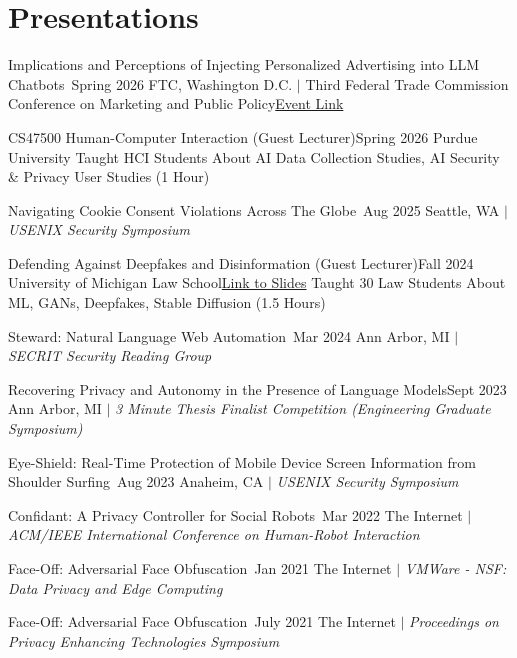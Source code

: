 \section{Presentations}
  \CVSubHeadingListStart

      \CVSubheading
      {Implications and Perceptions of Injecting Personalized Advertising into LLM Chatbots~\cite{chatbotads}}{Spring 2026}
      {FTC, Washington D.C. $|$ Third Federal Trade Commission Conference on Marketing and Public Policy}{\href{https://www.ftc.gov/news-events/events/2026/03/third-federal-trade-commission-conference-marketing-public-policy}{Event Link}}

    \CVSubheadingLong
      {CS47500 Human-Computer Interaction (Guest Lecturer)}{Spring 2026}
      {Purdue University}{}
      {Taught HCI Students About AI Data Collection Studies, AI Security \& Privacy User Studies (1 Hour)}{}

    \CVSubheading
      {{Navigating Cookie Consent Violations Across The Globe~\cite{ConsentChk}}}{Aug 2025}
      {{Seattle, WA} $|$ \emph{\small{USENIX Security Symposium}}}{}

    \CVSubheadingLong
      {Defending Against Deepfakes and Disinformation (Guest Lecturer)}{Fall 2024}
      {University of Michigan Law School}{\href{https://drive.google.com/drive/u/0/folders/1ERCBxNYdi3yjnO0RkuWOw-yk21fLrxiK}{Link to Slides}}
      {Taught 30 Law Students About ML, GANs, Deepfakes, Stable Diffusion (1.5 Hours)}{}

    \CVSubheading
      {{Steward: Natural Language Web Automation~\cite{steward}}}{Mar 2024}
      {{Ann Arbor, MI} $|$ \emph{\small{SECRIT Security Reading Group}}}{}

    \CVSubheading
      {{Recovering Privacy and Autonomy in the Presence of Language Models}}{Sept 2023}
      {{Ann Arbor, MI} $|$ \emph{\small{3 Minute Thesis Finalist Competition (Engineering Graduate Symposium)}}}{}

    \CVSubheading
      {{Eye-Shield: Real-Time Protection of Mobile Device Screen Information from Shoulder Surfing}~\cite{ShoulderSurfing}}{Aug 2023}
      {{Anaheim, CA} $|$ \emph{\small{USENIX Security Symposium}}}{}

    \CVSubheading
      {{Confidant: A Privacy Controller for Social Robots}~\cite{HRIPrivacy}}{Mar 2022}
      {{The Internet} $|$ \emph{\small{ACM/IEEE International Conference on Human-Robot Interaction}}}{}

    \CVSubheading
      {{Face-Off: Adversarial Face Obfuscation}~\cite{FaceOff}}{Jan 2021}
      {{The Internet} $|$ \emph{\small{VMWare - NSF: Data Privacy and Edge Computing}}}{}

    \CVSubheading
      {{Face-Off: Adversarial Face Obfuscation}~\cite{FaceOff}}{July 2021}
      {{The Internet} $|$ \emph{\small{Proceedings on Privacy Enhancing Technologies Symposium}}}{}
  \CVSubHeadingListEnd
